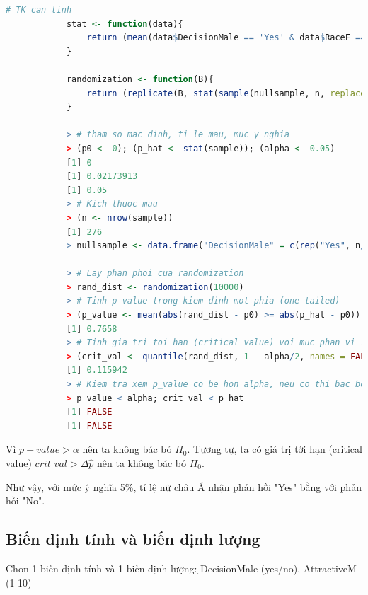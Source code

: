 \documentclass[a4paper,12pt]{article}
\begin{document}
			\begin{lstlisting}[language=R]
			# TK can tinh
			stat <- function(data){
				return (mean(data$DecisionMale == 'Yes' & data$RaceF == 'Asian') - mean(data$DecisionMale == 'No' & data$RaceF == 'Asian')) # Ti le khac biet
			}
			
			randomization <- function(B){
				return (replicate(B, stat(sample(nullsample, n, replace = TRUE))))
			}
			
			> # tham so mac dinh, ti le mau, muc y nghia
			> (p0 <- 0); (p_hat <- stat(sample)); (alpha <- 0.05)
			[1] 0
			[1] 0.02173913
			[1] 0.05
			> # Kich thuoc mau
			> (n <- nrow(sample))
			[1] 276
			> nullsample <- data.frame("DecisionMale" = c(rep("Yes", n/2), rep("No", n/2)), "RaceF" = rep("Asian", n)) # Mau du lieu tuong ung voi H0
			
			> # Lay phan phoi cua randomization
			> rand_dist <- randomization(10000)
			> # Tinh p-value trong kiem dinh mot phia (one-tailed)
			> (p_value <- mean(abs(rand_dist - p0) >= abs(p_hat - p0)))
			[1] 0.7658
			> # Tinh gia tri toi han (critical value) voi muc phan vi 1-alpha/2
			> (crit_val <- quantile(rand_dist, 1 - alpha/2, names = FALSE))
			[1] 0.115942
			> # Kiem tra xem p_value co be hon alpha, neu co thi bac bo H0
			> p_value < alpha; crit_val < p_hat
			[1] FALSE
			[1] FALSE
			\end{lstlisting}
			
			Vì $p-value > \alpha$ nên ta không bác bỏ $H_0$. Tương tự, ta có giá trị tới hạn (critical value) $crit\_val > \Delta\hat{p}$ nên ta không bác bỏ $H_0$.
			
			Như vậy, với mức ý nghĩa 5\%, tỉ lệ nữ châu Á nhận phản hồi "Yes" bằng với phản hồi "No".
		
		
	\subsection{Biến định tính và biến định lượng}
	Chon 1 biến định tính và 1 biến định lượng: ̣DecisionMale (yes/no), AttractiveM (1-10)
	
\end{document}
